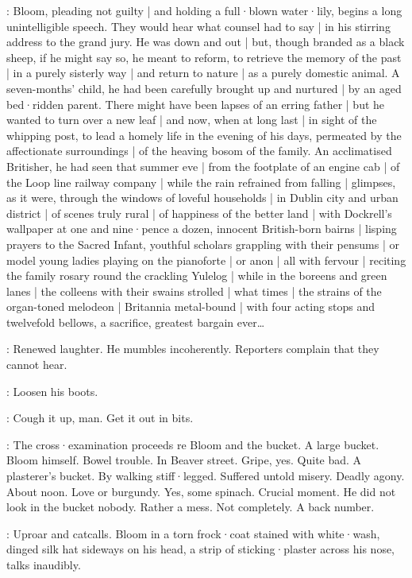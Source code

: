 :
Bloom,
pleading not guilty |
and holding a full·blown water·lily,
begins a long unintelligible speech.
They would hear what counsel had to say |
in his stirring address to the grand jury.
He was down and out |
but,
though branded as a black sheep,
if he might say so,
he meant to reform,
to retrieve the memory of the past |
in a purely sisterly way |
and return to nature |
as a purely domestic animal.
A seven-months' child,
he had been carefully brought up and nurtured |
by an aged bed·ridden parent.
There might have been lapses of an erring father |
but he wanted to turn over a new leaf |
and now,
when at long last |
in sight of the whipping post,
to lead a homely life in the evening of his days,
permeated by the affectionate surroundings |
of the heaving bosom of the family.
An acclimatised Britisher,
he had seen
that summer eve |
from the footplate of an engine cab |
of the Loop line railway company |
while the rain refrained from falling |
glimpses,
as it were,
through the windows of loveful households |
in Dublin city and urban district |
of scenes truly rural |
of happiness of the better land |
with Dockrell's wallpaper at one and nine·pence a dozen,
innocent British-born bairns |
lisping prayers to the Sacred Infant,
youthful scholars grappling with their pensums |
or model young ladies playing on the pianoforte |
or anon |
all with fervour |
reciting the family rosary round the crackling Yulelog |
while in the boreens and green lanes |
the colleens with their swains strolled |
what times |
the strains of the organ-toned melodeon |
Britannia metal-bound |
with four acting stops and twelvefold bellows,
a sacrifice,
greatest bargain ever\ldots

:
Renewed laughter.
He mumbles incoherently.
Reporters complain that they cannot hear.

\LongShortHand:
Loosen his boots.

\MacHugh:
Cough it up,
man.
Get it out in bits.

:
The cross·examination proceeds re Bloom and the bucket.
A large bucket.
Bloom himself.
Bowel trouble.
In Beaver street.
Gripe,
yes.
Quite bad.
A plasterer's bucket.
By walking stiff·legged.
Suffered untold misery.
Deadly agony.
About noon.
Love or burgundy.
Yes,
some spinach.
Crucial moment.
He did not look in the bucket nobody.
Rather a mess.
Not completely.
A 
back number.

:
Uproar and catcalls.
Bloom in a torn frock·coat stained with white·wash,
dinged silk hat sideways on his head,
a strip of sticking·plaster across his nose,
talks inaudibly.

